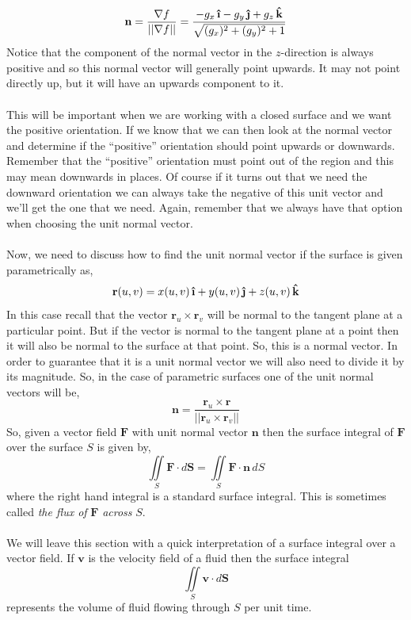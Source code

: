 \documentclass[10pt,reqno]{book}
\theoremstyle{definition}
\renewcommand{\vec}[1]{\mathbf{#1}}
\newcommand{\uvec}[1]{\boldsymbol{\hat{\textbf{#1}}}}
\begin{document}
	\[ \vec{n} = \frac{\nabla f}{|| \nabla f ||} = \frac{-g_x\,\uvec{\i} -g_y\,\uvec{\j} + g_z\,\uvec{k}}{\sqrt{(g_x)^2+(g_y)^2+1}} \]
	Notice that the component of the normal vector in the $ z $-direction is always positive and so this normal vector will generally point upwards. It may not point directly up, but it will have an upwards component to it.\\ \\
	This will be important when we are working with a closed surface and we want the positive orientation. If we know that we can then look at the normal vector and determine if the “positive” orientation should point upwards or downwards. Remember that the ``positive'' orientation must point out of the region and this may mean downwards in places. Of course if it turns out that we need the downward orientation we can always take the negative of this unit vector and we'll get the one that we need. Again, remember that we always have that option when choosing the unit normal vector.\\ \\
	Now, we need to discuss how to find the unit normal vector if the surface is given parametrically as,
	\[ \vec{r}(u,v) = x(u,v)\,\uvec{\i} + y(u,v)\,\uvec{\j} + z(u,v)\,\uvec{k} \]
	In this case recall that the vector $ \vec{r}_u \times \vec{r}_v $ will be normal to the tangent plane at a particular point. But if the vector is normal to the tangent plane at a point then it will also be normal to the surface at that point. So, this is a normal vector. In order to guarantee that it is a unit normal vector we will also need to divide it by its magnitude. So, in the case of parametric surfaces one of the unit normal vectors will be, 
	\[ \vec{n} = \frac{\vec{r}_u \times \vec{r}}{|| \vec{r}_u \times \vec{r}_v ||} \]
	So, given a vector field $ \vec{F} $ with unit normal vector $ \vec{n} $ then the surface integral of $ \vec{F} $ over the surface $ S $ is given by,
	\[ \iint\limits_S \vec{F} \cdot d\vec{S} = \iint\limits_S \vec{F} \cdot \vec{n} \,dS \]
	where the right hand integral is a standard surface integral. This is sometimes called \textit{the flux of} $ \vec{F} $ \textit{across} $ S $.\\ \\
	We will leave this section with a quick interpretation of a surface integral over a vector field. If $ \vec{v} $ is the velocity field of a fluid then the surface integral
	\[ \iint\limits_S \vec{v} \cdot d\vec{S} \]
	represents the volume of fluid flowing through $ S $ per unit time.
	
\end{document}
